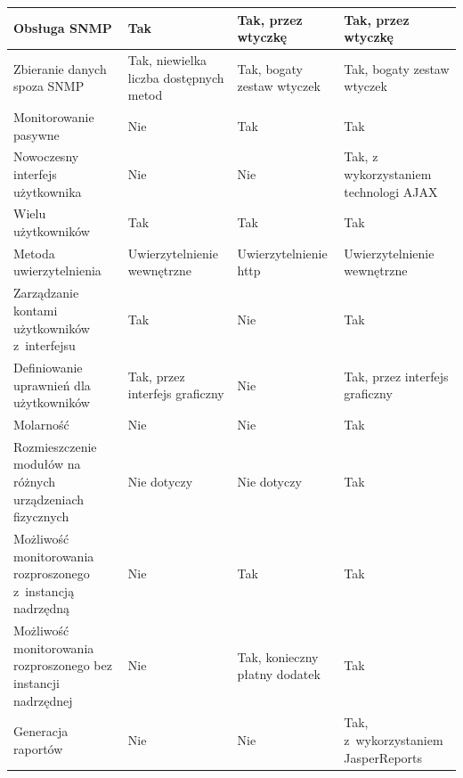 \begin{longtable}[c]{|p{4.5cm}||p{3cm}|p{3cm}|p{3cm}|}
  \raggedright{Obsługa SNMP} & \raggedright{Tak} &
  \raggedright{Tak, przez wtyczkę} & \raggedright{Tak, przez wtyczkę}
  \tabularnewline
  \hline

  \raggedright{Zbieranie danych spoza SNMP} & \raggedright{Tak, niewielka liczba dostępnych metod} &
  \raggedright{Tak, bogaty zestaw wtyczek} & \raggedright{Tak, bogaty zestaw wtyczek}
  \tabularnewline
  \hline

  \raggedright{Monitorowanie pasywne} & \raggedright{Nie} &
  \raggedright{Tak} & \raggedright{Tak}
  \tabularnewline
  \hline

  \raggedright{Nowoczesny interfejs użytkownika} & \raggedright{Nie} &
  \raggedright{Nie} & \raggedright{Tak, z wykorzystaniem technologi AJAX}
  \tabularnewline
  \hline

  \raggedright{Wielu użytkowników} & \raggedright{Tak} &
  \raggedright{Tak} & \raggedright{Tak}
  \tabularnewline
  \hline

  \raggedright{Metoda uwierzytelnienia} & \raggedright{Uwierzytelnienie wewnętrzne} &
  \raggedright{Uwierzytelnienie http} & \raggedright{Uwierzytelnienie wewnętrzne}
  \tabularnewline
  \hline

  \raggedright{Zarządzanie kontami użytkowników z~interfejsu} & \raggedright{Tak} &
  \raggedright{Nie} & \raggedright{Tak}
  \tabularnewline
  \hline

  \raggedright{Definiowanie uprawnień dla użytkowników} & \raggedright{Tak, przez interfejs graficzny} &
  \raggedright{Nie} & \raggedright{Tak, przez interfejs graficzny}
  \tabularnewline
  \hline

  \raggedright{Molarność} & \raggedright{Nie} &
  \raggedright{Nie} & \raggedright{Tak}
  \tabularnewline
  \hline

  \raggedright{Rozmieszczenie modułów na różnych urządzeniach fizycznych} & \raggedright{Nie dotyczy} &
  \raggedright{Nie dotyczy} & \raggedright{Tak}
  \tabularnewline
  \hline

  \raggedright{Możliwość monitorowania rozproszonego z~instancją
    nadrzędną} & \raggedright{Nie} & \raggedright{Tak} &
  \raggedright{Tak}
  \tabularnewline
  \hline

  \raggedright{Możliwość monitorowania rozproszonego bez instancji nadrzędnej} & \raggedright{Nie} &
  \raggedright{Tak, konieczny płatny dodatek} & \raggedright{Tak}
  \tabularnewline
  \hline

  \raggedright{Generacja raportów} & \raggedright{Nie} &
  \raggedright{Nie} & \raggedright{Tak, z~wykorzystaniem JasperReports}
  \tabularnewline
  \hline


\end{longtable}
